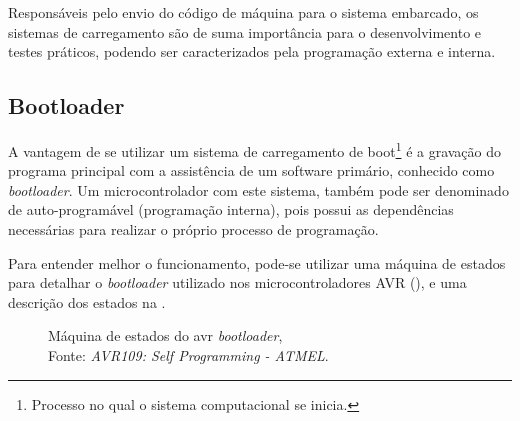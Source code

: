 Responsáveis pelo envio do código de máquina para o sistema embarcado, os sistemas de carregamento são de suma importância para o desenvolvimento e testes práticos, podendo ser caracterizados pela programação externa e interna.

\subsection{Bootloader}

A vantagem de se utilizar um sistema de carregamento de boot\footnote{Processo no qual o sistema computacional se inicia.} é
a gravação do programa principal com a assistência de um software primário, conhecido como \textit{bootloader}. Um microcontrolador
com este sistema, também pode ser denominado de auto-programável (programação interna), pois possui as dependências necessárias para realizar o próprio processo de programação.

Para entender melhor o funcionamento, pode-se utilizar uma máquina de estados para detalhar o \textit{bootloader} utilizado nos microcontroladores AVR (), e uma descrição dos estados na .

\begin{figure}[ht!]
  \centering
  \caption[Máquina de estados do avr \textit{bootloader}]{\label{fig:sm_bootloader}}{Máquina de estados
  do avr \textit{bootloader},\\Fonte: \textit{AVR109: Self Programming - ATMEL}.}
\end{figure}

